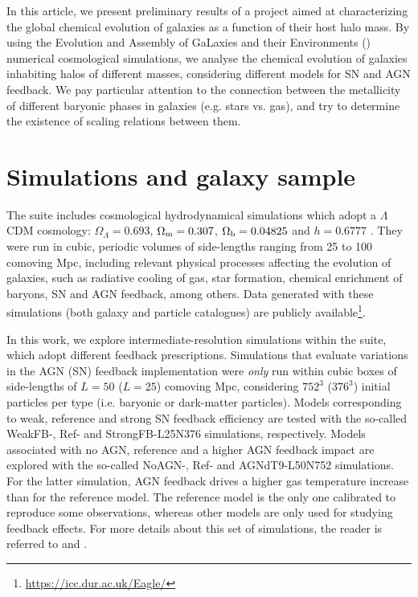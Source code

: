 \documentclass[baaa]{baaa}
\begin{document}
In this article, we present preliminary results of a project aimed at characterizing the global chemical evolution of galaxies as a function of their host halo mass. By using the Evolution and Assembly of GaLaxies and their Environments ({}) numerical cosmological simulations, we analyse the chemical evolution of galaxies inhabiting halos of different masses, considering different models for SN and AGN feedback. We pay particular attention to the connection between the metallicity of different baryonic phases in galaxies (e.g. stars vs. gas), and try to determine the existence of scaling relations between them.


\section{Simulations and galaxy sample}

The {} suite includes cosmological hydrodynamical simulations \citep{schaye2015, crain2015} which adopt a $\Lambda$CDM cosmology: $\Omega_{\Lambda} = 0.693$, $\Omega_{\rm m} = 0.307$, $\Omega_{\rm b} = 0.04825$
and $h=0.6777$ \citep{planck2014}. They were run in cubic, periodic volumes of side-lengths ranging from 25 to
100 comoving Mpc, including relevant physical processes affecting the evolution of galaxies, such as radiative cooling of gas, star formation, chemical enrichment of baryons, SN and AGN feedback, among others. Data generated with these simulations (both galaxy and particle catalogues) are publicly available{\footnote{{\url{https://icc.dur.ac.uk/Eagle/}}}}.


In this work, we explore intermediate-resolution simulations within the {} suite, which adopt different feedback prescriptions.
Simulations that evaluate variations in the AGN (SN) feedback implementation were {\em only} run within cubic boxes of side-lengths of $L=50$ ($L=25$) 
comoving Mpc, considering $752^3$ ($376^3$) initial particles per type (i.e. baryonic or dark-matter particles).
Models corresponding to weak, reference and strong SN feedback efficiency are tested with the so-called WeakFB-, Ref- and
StrongFB-L25N376 simulations, respectively.  Models associated with no AGN, reference and a higher AGN
feedback impact are explored with the so-called NoAGN-, Ref- and AGNdT9-L50N752 simulations. For
the latter simulation, AGN feedback drives a higher gas temperature increase than for the reference model.
The reference model is the only one calibrated to reproduce some observations, whereas other models are
only used for studying feedback effects.
For more details about this set of simulations, the reader is referred to \citet{schaye2015} and \citet{crain2015}.
\end{document}
